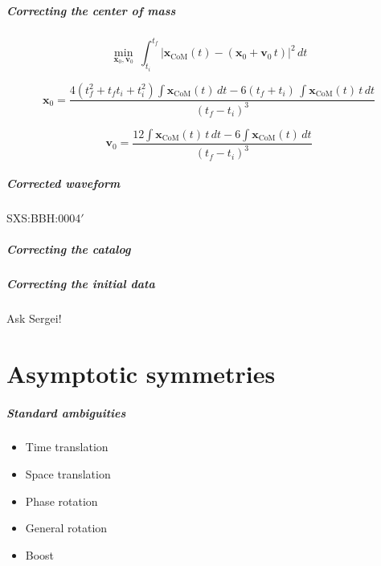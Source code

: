 \documentclass[12pt,xcolor={dvipsnames}]{beamer}
\renewcommand{\vec}{\bm}
\renewcommand{\vec}[1]{\boldsymbol{#1}}
\begin{document}
\begin{frame}
  \frametitle{Correcting the center of mass}
  \begin{equation*}
    \min_{\vec{x}_{0}, \vec{v}_{0}}\ \int_{t_{i}}^{t_{f}} \big\lvert
      \vec{x}_{\text{CoM}}(t) - (\vec{x}_{0} + \vec{v}_{0}\, t)
      \big\rvert^{2}\, d t
  \end{equation*}

  \pause
  \vspace{0.2in}
  \begin{equation*}
    \vec{x}_{0} = \frac{4 (t_{f}^{2} + t_{f} t_{i} + t_{i}^{2}) \int
      \vec{x}_{\text{CoM}}(t)\, d t - 6 (t_{f}+t_{i})\, \int
      \vec{x}_{\text{CoM}}(t)\, t\, d t} {(t_{f} - t_{i})^{3}}
  \end{equation*}

  \vspace{0.2in}
  \begin{equation*}
    \vec{v}_{0} = \frac{12 \int \vec{x}_{\text{CoM}}(t)\, t\, d t - 6
      \int \vec{x}_{\text{CoM}}(t)\, d t} {(t_{f} - t_{i})^{3}}
  \end{equation*}
\end{frame}

\begin{frame}
  \frametitle{Corrected waveform}
  SXS:BBH:0004$'$
\end{frame}

\begin{frame}
  \frametitle{Correcting the catalog}

\end{frame}

\begin{frame}
  \frametitle{Correcting the initial data}
  Ask Sergei!
\end{frame}



\part{Asymptotic symmetries}
\partpage

\begin{frame}
  \frametitle{Standard ambiguities}
  \begin{itemize}
  \item Time translation
  \item<3-> Space translation
  \item Phase rotation
  \item<2-> General rotation
  \item<4-> Boost
  \end{itemize}

  \vspace{0.25in}

  \begin{center}

  \end{center}
\end{frame}
\end{document}
